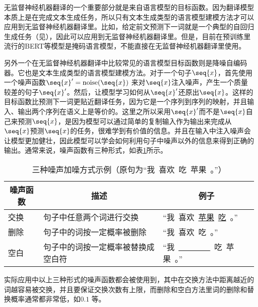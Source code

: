 
\parinterval 无监督神经机器翻译的一个重要部分就是来自语言模型的目标函数。因为翻译模型本质上是在完成文本生成任务，所以只有文本生成类型的语言模型建模方法才可以应用到无监督神经机器翻译里。比如，给定前文预测下一词就是一个典型的自回归生成任务（见{\chaptertwo}），因此可以应用到无监督神经机器翻译里。但是，目前在预训练里流行的BERT等模型是掩码语言模型，不能直接在无监督神经机器翻译里使用。

\parinterval 另外一个在无监督神经机器翻译中比较常见的语言模型目标函数则是降噪自编码器。它也是文本生成类型的语言模型建模方法。对于一个句子$\seq{x}$，首先使用一个噪声函数$\seq{x}'=\mathrm{noise}(\seq{x})$ 来对$\seq{x}$注入噪声，产生一个质量较差的句子$\seq{x}'$。然后，让模型学习如何从$\seq{x}'$还原出$\seq{x}$。这样的目标函数比预测下一词更贴近翻译任务，因为它是一个序列到序列的映射，并且输入、输出两个序列在语义上是等价的。这里之所以采用$\seq{x}'$而不是$\seq{x}$自己来预测$\seq{x}$，是因为模型可以通过简单的复制输入作为输出来完成从$\seq{x}$预测$\seq{x}$的任务，很难学到有价值的信息。并且在输入中注入噪声会让模型更加健壮，因此模型可以学会如何利用句子中噪声以外的信息来得到正确的输出。通常来说，噪声函数有三种形式，如表\ref{tab:16-1}所示。
\begin{table}[h]
\centering
\caption{三种噪声加噪方式示例（原句为``我\ 喜欢\ 吃\ 苹果\ 。''）}
\begin{tabular}{l|l|l}
\multicolumn{1}{c|}{噪声函数} & \multicolumn{1}{c|}{描述} & \multicolumn{1}{c}{例子} \\
\hline
\rule{0pt}{15pt}交换 & 句子中任意两个词进行交换 & ``我\ 喜欢\ \underline{苹果}\ \underline{吃}\ 。'' \\
\rule{0pt}{15pt}删除 & 句子中的词按一定概率被删除 & ``我\ 喜欢\ 吃\ 。'' \\
\rule{0pt}{15pt}空白 & 句子中的词按一定概率被替换成空白符 & ``我\ \underline{\ \ \ \ \ \ \ \ }\ 吃\ 苹果\ 。'' \\
\end{tabular}
\label{tab:16-1}
\end{table}

\parinterval 实际应用中以上三种形式的噪声函数都会被使用到，其中在交换方法中距离越近的词越容易被交换，并且要保证交换次数有上限，而删除和空白方法里词的删除和替换概率通常都非常低，如$0.1$ 等。

\sectionnewpage
